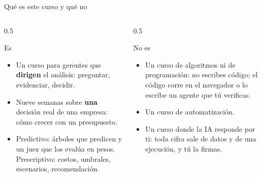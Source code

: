 \documentclass{beamer}
\begin{document}
\begin{frame}
\titlepage
\end{frame}

\begin{frame}{Qué es este curso y qué no}
\begin{columns}[T]
\begin{column}{0.5\textwidth}
\begin{exampleblock}{Es}
\begin{itemize}
  \item Un curso para gerentes que \textbf{dirigen} el análisis: preguntar, evidenciar, decidir.
  \item Nueve semanas sobre \textbf{una} decisión real de una empresa: cómo crecer con un presupuesto.
  \item Predictivo: árboles que predicen y un juez que los evalúa en pesos. Prescriptivo: costos, umbrales, escenarios, recomendación.
\end{itemize}
\end{exampleblock}
\end{column}
\begin{column}{0.5\textwidth}
\begin{alertblock}{No es}
\begin{itemize}
  \item Un curso de algoritmos ni de programación: no escribes código; el código corre en el navegador o lo escribe un agente que tú verificas.
  \item Un curso de automatización.
  \item Un curso donde la IA responde por ti: toda cifra sale de datos y de una ejecución, y tú la firmas.
\end{itemize}
\end{alertblock}
\end{column}
\end{columns}
\end{frame}
\end{document}
